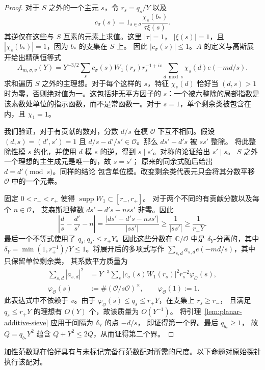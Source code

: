 \documentclass[11pt,a4paper]{article}
\numberwithin{equation}{section}
\numberwithin{figure}{section}
\theoremstyle{definition}
\theoremstyle{remark}
\begin{document}
\begin{proof}
对于 $S$ 之外的一个主元 $s$，令 $r_s=q_s/Y$ 以及
\[
 c_\sigma(s)=1_{s\in\sigma}\frac{\chi_s(b_*)}{\tau\xi(s)}.
\]
其逆仅在这些与 $S$ 互素的元素上求值。这里 $|\tau|=1$，
$|\xi(s)|=1$，且 $|\chi_s(b_*)|=1$，因为 $b_*$ 的支集在 $S$ 上。
因此 $|c_\sigma(s)|\le1$。$A$ 的定义与高斯展开给出精确恒等式
\[
 A_{m,\sigma,v}(Y)
 =Y^{-3/2}\sum_s c_\sigma(s)W_1(r_s)r_s^{-1+iv}
       \sum_{d\bmod s}\chi_s(d)e(-md/s).
\]
求和遍历 $S$ 之外的主理想。对于每个这样的 $s$，特征 $\chi_s(d)$ 恰好当 $(d,s)>1$ 时为零，否则绝对值为一。这包括非无平方因子的 $s$：一个被六整除的局部指数是该素数处单位的指示函数，而不是常函数一。对于 $s=1$，单个剩余类被包含在内，且
$\chi_1=1$。

我们验证，对于有贡献的数对，分数 $d/s$ 在模 $\mathcal O$ 下互不相同。假设 $(d,s)=(d',s')=1$ 且
$d/s-d'/s'\in\mathcal O$。那么 $ds'-d's$ 被 $ss'$ 整除。
将此整除性模 $s$ 约化，并使用 $d$ 模
$s$ 的逆，得到 $s\mid s'$。对称的论证给出 $s'\mid s$。
$S$ 之外一个理想的主生成元是唯一的，故 $s=s'$；
原来的同余式随后给出 $d=d'\pmod s$。同样的结论
包含单位模。改变剩余类代表元只会将其分数平移 $\mathcal O$ 中的一个元素。

固定 $0<r_-<r_+$ 使得 $\operatorname{supp}W_1\subset[r_-,r_+]$。
对于两个不同的有贡献分数以及每个 $n\in\mathcal O$，
艾森斯坦整数 $ds'-d's-nss'$ 非零。因此
\[
 \left|\frac d s-\frac{d'}{s'}-n\right|
 =\frac{|ds'-d's-nss'|}{|ss'|}
 \ge\frac1{|ss'|}\ge\frac1{r_+Y}.
\]
最后一个不等式使用了 $q_s,q_{s'}\le r_+Y$。因此这些分数在
$\mathbb C/\mathcal O$ 中是
$\delta_Y$-分离的，其中
$\delta_Y=\min(1,r_+^{-1})/Y\le1$。将展开后的多项式写作
$\sum_{s,d}a_{s,d}e(-md/s)$，其中只保留单位剩余类，
其系数平方质量为
\[
 \begin{split}
 \sum_{s,d}|a_{s,d}|^2
 &=Y^{-3}\sum_s |c_\sigma(s)W_1(r_s)|^2r_s^{-2}
       \varphi_{\mathcal O}(s),\\
 \varphi_{\mathcal O}(s)
 &:=\#(\mathcal O/s\mathcal O)^\times,\qquad
 \varphi_{\mathcal O}(1):=1.
 \end{split}
\]
此表达式中不依赖于 $v$。由于
$\varphi_{\mathcal O}(s)\le q_s\le r_+Y$，在支集上 $r_s\ge r_-$，
且满足 $q_s\le r_+Y$ 的理想有 $O(Y)$ 个，故该质量为 $O(Y^{-1})$。
将引理~\ref{lem:planar-additive-sieve} 应用于间隔为 $\delta_Y$ 的点 $-d/s$，
即证得第一个界。最后 $q_{b_*}\ge1$，
故 $Q=q_{b_*}Y^2$ 蕴含 $Q+Y^2\le2Q$，从而证得第二个界。
\end{proof}

加性范数现在恰好具有与未标记完备行范数配对所需的尺度。以下命题对原始探针执行该配对。
\end{document}
